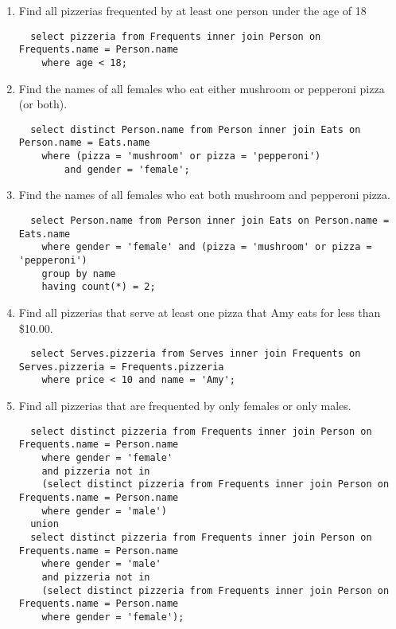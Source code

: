 \documentclass[a4paper,12pt]{article}
\begin{document}
 \hline
\begin{enumerate}
 \item Find all pizzerias frequented by at least one person under the age of 18
 \begin{lstlisting}
  select pizzeria from Frequents inner join Person on Frequents.name = Person.name
	where age < 18;
 \end{lstlisting}
 \item Find the names of all females who eat either mushroom or pepperoni pizza (or both).
 \begin{lstlisting}
  select distinct Person.name from Person inner join Eats on Person.name = Eats.name
	where (pizza = 'mushroom' or pizza = 'pepperoni') 
		and gender = 'female';
 \end{lstlisting}
 \item Find the names of all females who eat both mushroom and pepperoni pizza.
 \begin{lstlisting}
  select Person.name from Person inner join Eats on Person.name = Eats.name
	where gender = 'female' and (pizza = 'mushroom' or pizza = 'pepperoni')
    group by name
    having count(*) = 2;
 \end{lstlisting}
 \item Find all pizzerias that serve at least one pizza that Amy eats for less than \$10.00.
 \begin{lstlisting}
  select Serves.pizzeria from Serves inner join Frequents on Serves.pizzeria = Frequents.pizzeria
	where price < 10 and name = 'Amy';
 \end{lstlisting}
 \item Find all pizzerias that are frequented by only females or only males.
 \begin{lstlisting}
  select distinct pizzeria from Frequents inner join Person on Frequents.name = Person.name    
	where gender = 'female'
    and pizzeria not in
    (select distinct pizzeria from Frequents inner join Person on Frequents.name = Person.name    
	where gender = 'male')
  union
  select distinct pizzeria from Frequents inner join Person on Frequents.name = Person.name    
	where gender = 'male'
    and pizzeria not in
    (select distinct pizzeria from Frequents inner join Person on Frequents.name = Person.name    
	where gender = 'female');
 \end{lstlisting}
 \vspace{1cm}

\end{enumerate}
\end{document}
